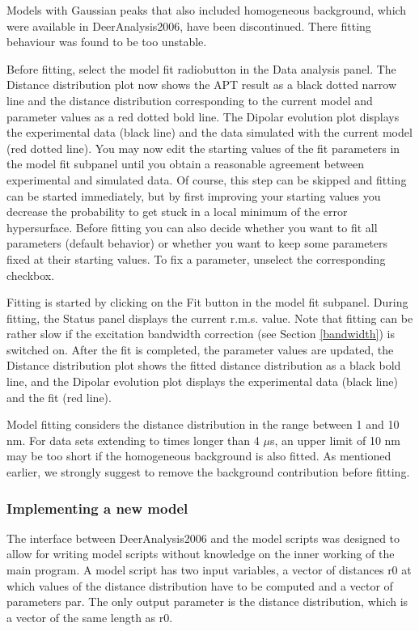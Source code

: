 \documentclass{article}
\begin{document}
Models with Gaussian peaks that also included homogeneous background, which were available in DeerAnalysis2006, have been discontinued. There fitting behaviour was found to be too unstable.

Before fitting, select the {\ttfamily model fit} radiobutton in the {\ttfamily Data analysis} panel. The {\ttfamily Distance distribution} plot now shows the APT result as a black dotted narrow line and the distance distribution corresponding to the current model and parameter values as a red dotted bold line. The {\ttfamily Dipolar evolution} plot displays the experimental data (black line) and the data simulated with the current model (red dotted line). You may now edit the starting values of the fit parameters in the {\ttfamily model fit} subpanel until you obtain a reasonable agreement between experimental and simulated data. Of course, this step can be skipped and fitting can be started immediately, but by first improving your starting values you decrease the probability to get stuck in a local minimum of the error hypersurface. Before fitting you can also decide whether you want to fit all parameters (default behavior) or whether you want to keep some parameters fixed at their starting values. To fix a parameter, unselect the corresponding checkbox.

Fitting is started by clicking on the {\ttfamily Fit} button in the {\ttfamily model fit} subpanel. During fitting, the {\ttfamily Status} panel displays the current r.m.s. value. Note that fitting can be rather slow if the excitation bandwidth correction (see Section \ref{bandwidth}) is switched on. After the fit is completed, the parameter values are updated, the {\ttfamily Distance distribution} plot shows the fitted distance distribution as a black bold line, and the {\ttfamily Dipolar evolution} plot displays the experimental data (black line) and the fit (red line).   

Model fitting considers the distance distribution in the range between 1 and 10 nm. For data sets extending to times longer than 4 $\mu$s, an upper limit of 10 nm may be too short if the homogeneous background is also fitted. As mentioned earlier, we strongly suggest to remove the background contribution before fitting.  
   
\subsubsection{Implementing a new model}
\label{new_model}   
The interface between DeerAnalysis2006 and the model scripts was designed to allow for writing model scripts without knowledge on the inner working of the main program. A model script has two input variables, a vector of distances {\ttfamily r0} at which values of the distance distribution have to be computed and a vector of parameters {\ttfamily par}. The only output parameter is the distance distribution, which is a vector of the same length as {\ttfamily r0}. 
\end{document}
